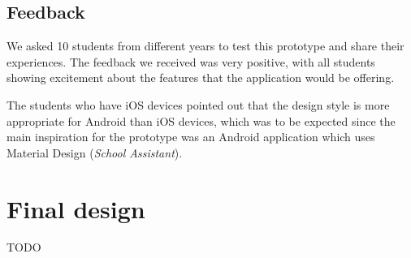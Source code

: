 \subsection{Feedback} \label{4:wireframe_feedback}

We asked 10 students from different years to test this prototype and share their experiences. The feedback we received was very positive, with all students showing excitement about the features that the application would be offering.

The students who have iOS devices pointed out that the design style is more appropriate for Android than iOS devices, which was to be expected since the main inspiration for the prototype was an Android application which uses Material Design\cite{google2020material} (\textit{School Assistant}).

\section{Final design} \label{4:final}
TODO